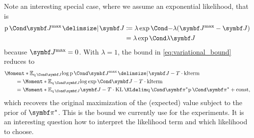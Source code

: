 Note an interesting special case, where we assume an exponential likelihood, that is
\begin{align}
\begin{split}
    \Prob{\mat{J}^\text{max} \given \mat{J}}
    &\coloneqq \lambda \Fun{\exp}{-\lambda (\mat{J}^\text{max} - \mat{J})} \\
    &= \lambda \Fun{\exp}{\lambda \mat{J}}
\end{split}
\end{align}
because $\mat{J}^\text{max} = 0$.
With $\lambda = 1$, the bound in \cref{eq:variational_bound} reduces to
\begin{align}
\begin{split}
    \MoveEqLeft\Moment*{\E_{\Variat{\mat{J}}}}{\log \Prob{\mat{J}^{\text{max}} \given \mat{J}}} - T \cdot \text{klterm}
    \\
    &= \Moment*{\E_{\Variat{\mat{J}}}}{\log \Fun{\exp}{\mat{J}}} - T \cdot \text{klterm}
    \\
    &= \Moment*{\E_{\Variat{\mat{J}}}}{\mat{J}} - T \cdot \KL{\Variat{\mat{\pi}^\ast}}{\Prob{\mat{\pi}^\ast}} + \text{const},
\end{split}
\end{align}
which recovers the original maximization of the (expected) value subject to the prior of $\mat{\pi}^\ast$.
This is the bound we currently use for the experiments.
It is an interesting question how to interpret the likelihood term and which likelihood to choose.


